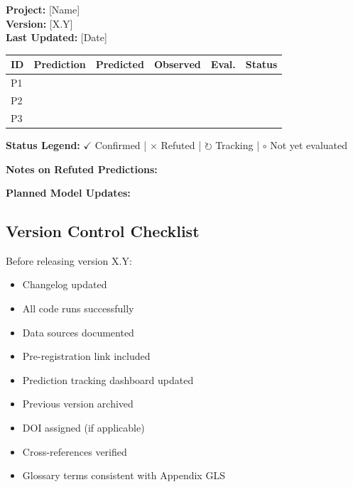 \begin{tcolorbox}[colback=gray!5!white, colframe=gray!75!black,
    title=\textbf{EBF Prediction Tracking Dashboard}]

\textbf{Project:} [Name] \\
\textbf{Version:} [X.Y] \\
\textbf{Last Updated:} [Date]

\vspace{0.5em}

\begin{tabular}{@{}lccccl@{}}
\toprule
\textbf{ID} & \textbf{Prediction} & \textbf{Predicted} & \textbf{Observed} & \textbf{Eval.} & \textbf{Status} \\
\midrule
P1 & & & & & \\
P2 & & & & & \\
P3 & & & & & \\
\bottomrule
\end{tabular}

\vspace{0.5em}

\textbf{Status Legend:}
$\checkmark$ Confirmed |
$\times$ Refuted |
$\circlearrowright$ Tracking |
$\circ$ Not yet evaluated

\textbf{Notes on Refuted Predictions:}

\textbf{Planned Model Updates:}

\end{tcolorbox}

\subsection{Version Control Checklist}

\begin{tcolorbox}[colback=gray!5!white, colframe=gray!75!black,
    title=\textbf{EBF Version Release Checklist}]

Before releasing version X.Y:

\begin{itemize}
    \item[$\square$] Changelog updated
    \item[$\square$] All code runs successfully
    \item[$\square$] Data sources documented
    \item[$\square$] Pre-registration link included
    \item[$\square$] Prediction tracking dashboard updated
    \item[$\square$] Previous version archived
    \item[$\square$] DOI assigned (if applicable)
    \item[$\square$] Cross-references verified
    \item[$\square$] Glossary terms consistent with Appendix GLS
\end{itemize}

\end{tcolorbox}


